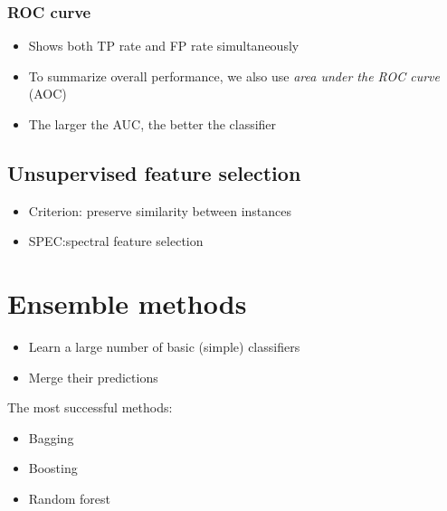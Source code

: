\documentclass{article}
\begin{document}
        \subsubsection{ROC curve}
        \begin{itemize}
            \item Shows both TP rate and FP rate simultaneously
            \item To summarize overall performance, we also use \textit{area under the ROC curve} (AOC)
            \item The larger the AUC, the better the classifier
        \end{itemize}

    \subsection{Unsupervised feature selection}
    \begin{itemize}
        \item Criterion: preserve similarity between instances
        \item SPEC:\@ spectral feature selection
    \end{itemize}

    \newpage

\section{Ensemble methods}
    \begin{itemize}
        \item Learn a large number of basic (simple) classifiers
        \item Merge their predictions
    \end{itemize}

    The most successful methods:
    \begin{itemize}
        \item Bagging
        \item Boosting
        \item Random forest
    \end{itemize}
\end{document}
